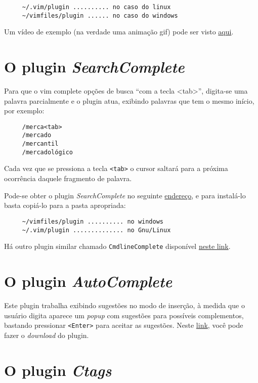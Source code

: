 \begin{verbatim}
     ~/.vim/plugin .......... no caso do linux
     ~/vimfiles/plugin ...... no caso do windows
\end{verbatim}

Um vídeo de exemplo (na verdade uma animação gif) pode ser visto
\href{http://downloads.veryspeedy.net/vim/EasyGrep.gif}{aqui}.

\section{O plugin {\em SearchComplete}}

Para que o vim complete opções de busca ``com a tecla <tab>'', digita-se uma
palavra parcialmente e o plugin atua, exibindo palavras que tem 
o mesmo início, por exemplo:

\begin{verbatim}
     /merca<tab>
     /mercado
     /mercantil
     /mercadológico
\end{verbatim}

Cada vez que se pressiona a tecla {\tt <tab>} o cursor saltará para 
a próxima ocorrência daquele fragmento de palavra.

Pode-se obter o plugin {\em SearchComplete} no seguinte 
\href{http://www.vim.org/scripts/script.php?script\_id=474}{endereço}, 
e para instalá-lo basta copiá-lo para a pasta apropriada:
    
\begin{verbatim}
     ~/vimfiles/plugin .......... no windows
     ~/.vim/plugin .............. no Gnu/Linux
\end{verbatim}

Há outro plugin similar chamado {\tt CmdlineComplete} disponível  
\href{http://www.vim.org/scripts/script.php?script\_id=2222}{neste link}.


\section{O plugin {\em AutoComplete}}
\label{sec:O Plugin AutoComplete}

Este plugin trabalha exibindo sugestões no modo de inserção, à
medida que o usuário digita aparece um {\em popup} com sugestões para possíveis
complementos, bastando pressionar {\tt <Enter>} para aceitar as sugestões.
Neste \href{http://www.vim.org/scripts/script.php?script\_id=1879}{link}, você pode
fazer o {\em download} do plugin.

\section{O plugin {\em Ctags}}
\label{sec:O Plugin Ctags}

